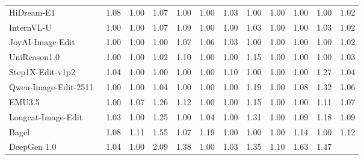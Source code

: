 \begin{table}[t]
{\begin{tabular}{l|cccccccccc|c}
            HiDream-E1~\cite{cai2025hidream}
            & 1.08 & 1.00 & 1.07 & 1.00 & 1.00 & 1.03 & 1.00 & 1.00 & 1.00 & 1.00
            & \cellcolor[HTML]{C8C8C8}1.02  \\

            InternVL-U~\cite{tian2026internvl}
            & 1.00 & 1.00 & 1.07 & 1.09 & 1.00 & 1.00 & 1.03 & 1.00 & 1.00 & 1.03
            & \cellcolor[HTML]{C8C8C8}1.02 \\

            JoyAI-Image-Edit~\cite{joyaiimage2026}
            & 1.00 & 1.00 & 1.00 & 1.07 & 1.06 & 1.03 & 1.00 & 1.00 & 1.00 & 1.00
            & \cellcolor[HTML]{C8C8C8}1.02 \\

            UniReason1.0~\cite{wang2026unireason}
            & 1.00 & 1.00 & 1.02 & 1.10 & 1.00 & 1.00 & 1.15 & 1.00 & 1.00 & 1.00
            & \cellcolor[HTML]{C8C8C8}1.03 \\

            Step1X-Edit-v1p2~\cite{liu2025step1x}
            & 1.04 & 1.00 & 1.00 & 1.00 & 1.00 & 1.10 & 1.00 & 1.00 & 1.00 & 1.27
            & \cellcolor[HTML]{C8C8C8}1.04 \\

            Qwen-Image-Edit-2511~\cite{wu2025qwen}
            & 1.00 & 1.00 & 1.04 & 1.00 & 1.00 & 1.00 & 1.19 & 1.00 & 1.08 & 1.32
            & \cellcolor[HTML]{C8C8C8}1.06 \\

            
            EMU3.5~\cite{cui2025emu3}
            & 1.00 & 1.07 & 1.26 & 1.12 & 1.00 & 1.00 & 1.15 & 1.00 & 1.00 & 1.11
            & \cellcolor[HTML]{C8C8C8}1.07 \\


            Longcat-Image-Edit~\cite{team2025longcat}
            & 1.03 & 1.00 & 1.25 & 1.00 & 1.04 & 1.00 & 1.31 & 1.00 & 1.09 & 1.18
            & \cellcolor[HTML]{C8C8C8}1.09 \\

            
            Bagel~\cite{deng2025emerging}
            & 1.08 & 1.11 & 1.55 & 1.07 & 1.19 & 1.00 & 1.00 & 1.00 & 1.14 & 1.00
            & \cellcolor[HTML]{C8C8C8}1.12 \\


            DeepGen 1.0~\cite{wang2026deepgen}
            & 1.04 & 1.00 & 2.09 & 1.38 & 1.00 & 1.03 & 1.35 & 1.10 & 1.63 & 1.47
            & \cellcolor[HTML]{C8C8C8}{\color[HTML]{F88825}\textbf{1.31}} \\


\end{tabular}}
\end{table}
